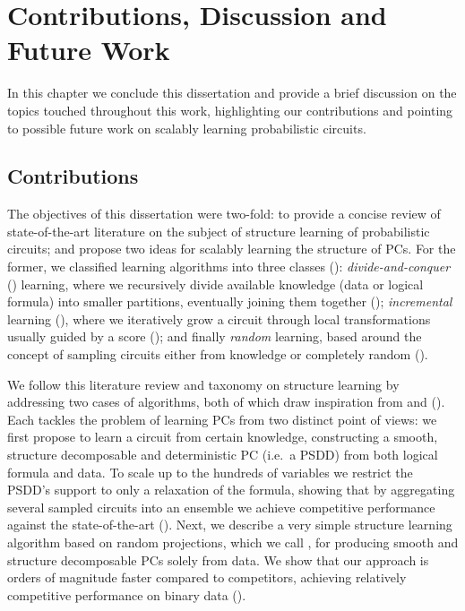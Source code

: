 \chapter{Contributions, Discussion and Future Work}
\label{ch:conclusion}

In this chapter we conclude this dissertation and provide a brief discussion on the topics touched
throughout this work, highlighting our contributions and pointing to possible future work on
scalably learning probabilistic circuits.

\section{Contributions}

The objectives of this dissertation were two-fold: to provide a concise review of state-of-the-art
literature on the subject of structure learning of probabilistic circuits; and propose two ideas
for scalably learning the structure of PCs. For the former, we classified learning algorithms into
three classes (): \emph{divide-and-conquer} (\divclass{}) learning, where we
recursively divide available knowledge (data or logical formula) into smaller partitions,
eventually joining them together (); \emph{incremental} learning (\incrclass{}),
where we iteratively grow a circuit through local transformations usually guided by a score
(); and finally \emph{random} learning, based around the concept of sampling
circuits either from knowledge or completely random ().

We follow this literature review and taxonomy on structure learning by addressing two cases of
\randclass{} algorithms, both of which draw inspiration from \divclass{} and \incrclass{}
(). Each tackles the problem of learning PCs from two distinct point of views:
we first propose  to learn a circuit from certain knowledge, constructing a
smooth, structure decomposable and deterministic PC (i.e.\ a PSDD) from both logical formula and
data. To scale up to the hundreds of variables we restrict the PSDD's support to only a relaxation
of the formula, showing that by aggregating several sampled circuits into an ensemble we achieve
competitive performance against the state-of-the-art (). Next, we describe a very
simple \randclass{} structure learning algorithm based on random projections, which we call
, for producing smooth and structure decomposable PCs solely from data. We show
that our approach is orders of magnitude faster compared to competitors, achieving relatively
competitive performance on binary data ().

